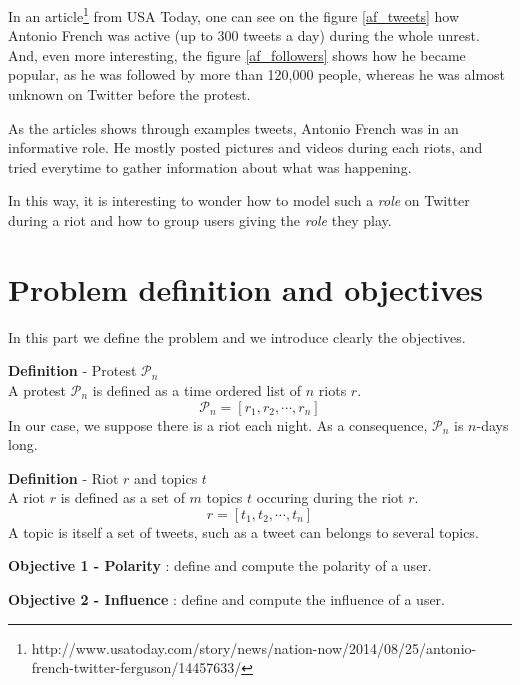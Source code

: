 \documentclass[a4paper,12pt]{report}
\begin{document}
In an article\footnote{http://www.usatoday.com/story/news/nation-now/2014/08/25/antonio-french-twitter-ferguson/14457633/} from USA Today, one can see on the figure \ref{af_tweets} how Antonio French was active (up to 300 tweets a day) during the whole unrest. And, even more interesting, the figure \ref{af_followers} shows how he became popular, as he was followed by more than 120,000 people, whereas he was almost unknown on Twitter before the protest. 

As the articles shows through examples tweets, Antonio French was in an informative role. He mostly posted pictures and videos during each riots, and tried everytime to gather information about what was happening. 

In this way, it is interesting to wonder how to model such a \emph{role} on Twitter during a riot and how to group users giving the \emph{role} they play.

\newpage

\section{Problem definition and objectives}

In this part we define the problem and we introduce clearly the objectives.

\begin{defbox}
\textbf{Definition} - Protest $\mathcal{P}_n$\\
A protest $\mathcal{P}_n$ is defined as a time ordered list of $n$ riots $r$.
$$ \mathcal{P}_n = [r_1, r_2, \cdots, r_n]$$
In our case, we suppose there is a riot each night. As a consequence, $\mathcal{P}_n$ is $n$-days long.
\end{defbox}

\begin{defbox}
\textbf{Definition} - Riot $r$ and topics $t$\\
A riot $r$ is defined as a set of $m$ topics $t$ occuring during the riot $r$.
$$ r = [t_1, t_2, \cdots, t_n]$$
A topic is itself a set of tweets, such as a tweet can belongs to several topics.
\end{defbox}



\begin{objbox}\color{Maroon}
\textbf{Objective 1 - Polarity} : define and compute the polarity of a user.
\end{objbox}

\begin{objbox}\color{Maroon}
\textbf{Objective 2 - Influence} : define and compute the influence of a user.
\end{objbox}
\end{document}
